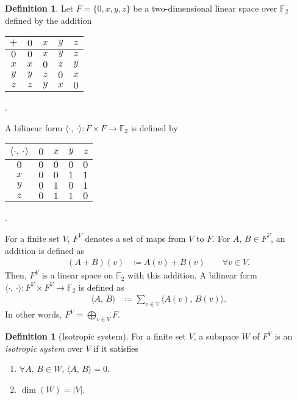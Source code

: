 \documentclass[twoside,10pt]{article}
\theoremstyle{definition}
\newtheorem{definition}[theorem]{Definition}
\theoremstyle{remark}
\begin{document}
\begin{definition}
Let $F=\{0,x,y,z\}$ be a two-dimensional linear space over $\mathbb{F}_2$ defined by the addition
\begin{table}[h]
\centering
\begin{tabular}[b]{|c|cccc|}
\hline
$+$&$0$&$x$&$y$&$z$\\
\hline
$0$&$0$&$x$&$y$&$z$\\
$x$&$x$&$0$&$z$&$y$\\
$y$&$y$&$z$&$0$&$x$\\
$z$&$z$&$y$&$x$&$0$\\
\hline
\end{tabular}.
\end{table}

A bilinear form $\langle\cdot,\,\cdot\rangle\colon F\times F\to\mathbb{F}_2$ is defined by
\begin{table}[h]
\centering
\begin{tabular}[b]{|c|cccc|}
\hline
$\langle\cdot,\,\cdot\rangle$&$0$&$x$&$y$&$z$\\
\hline
$0$&$0$&$0$&$0$&$0$\\
$x$&$0$&$0$&$1$&$1$\\
$y$&$0$&$1$&$0$&$1$\\
$z$&$0$&$1$&$1$&$0$\\
\hline
\end{tabular}.
\end{table}

For a finite set $V$, $F^V$ denotes a set of maps from $V$ to $F$.
For $A,\, B\in F^V$, an addition is defined as
\begin{align*}
(A+B)(v)&\coloneq A(v) + B(v)\qquad\forall v\in V.
\end{align*}
Then, $F^V$ is a linear space on $\mathbb{F}_2$ with this addition.
A bilinear form $\langle\cdot,\,\cdot\rangle\colon F^V\times F^V\to\mathbb{F}_2$ is defined as
\begin{align*}
\langle A,\,B\rangle &\coloneqq \sum_{v\in V} \langle A(v),\,B(v)\rangle.
\end{align*}
In other words, $F^V = \bigoplus_{v\in V}F$.
\end{definition}

\begin{definition}[Isotropic system]
For a finite set $V$, a subspace $W$ of $F^V$ is an \textit{isotropic system} over $V$ if it satisfies
\begin{enumerate}
\item $\forall A,\,B\in W$, $\langle A,\,B\rangle = 0$.
\item $\dim(W) = |V|$.
\end{enumerate}
\end{definition}
\end{document}

